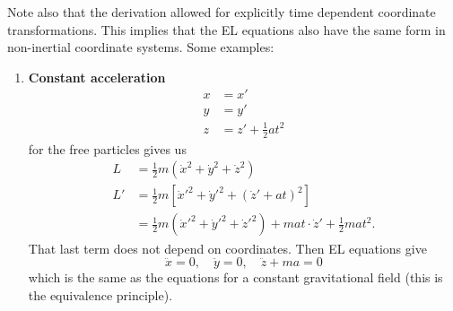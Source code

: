 \documentclass[12pt]{article} %
\begin{document}
Note also that the derivation allowed for explicitly time dependent coordinate transformations. This implies that the EL equations also have the same form in non-inertial coordinate systems. Some examples:
\begin{enumerate}
\item \textbf{Constant acceleration}
\begin{align}
x &= x' \\
y &= y' \\
z &= z' + \frac{1}{2} a t^2
\end{align}
for the free particles gives us
\begin{align}
L &= \frac{1}{2} m (\dot{x}^2 + \dot{y}^2 + \dot{z}^2) \\
L' &= \frac{1}{2} m \left[ \dot{x}'^2 + \dot{y}'^2 + (\dot{z}' + at)^2 \right] \\
	&= \frac{1}{2} m (\dot{x}'^2 + \dot{y}'^2 + \dot{z}'^2) + mat \cdot \dot{z}' + \frac{1}{2} mat^2.
\end{align}
That last term does not depend on coordinates. Then EL equations give
\begin{equation}
\ddot{x} = 0, \quad \ddot{y} = 0, \quad \ddot{z} + ma = 0
\end{equation}
which is the same as the equations for a constant gravitational field (this is the equivalence principle). 


\end{enumerate}
\end{document}
